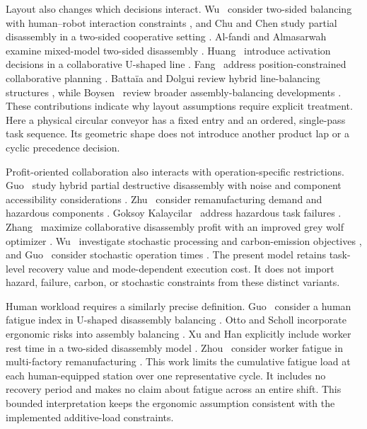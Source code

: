 Layout also changes which decisions interact. Wu \etal\ consider two-sided balancing with human--robot interaction constraints \cite{Wu2023}, and Chu and Chen study partial disassembly in a two-sided cooperative setting \cite{Chu2025}. Al-fandi and Almasarwah examine mixed-model two-sided disassembly \cite{Alfandi2025}. Huang \etal\ introduce activation decisions in a collaborative U-shaped line \cite{Huang2025}. Fang \etal\ address position-constrained collaborative planning \cite{Fang2024}. Batta\"ia and Dolgui review hybrid line-balancing structures \cite{Battaia2022}, while Boysen \etal\ review broader assembly-balancing developments \cite{Boysen2022}. These contributions indicate why layout assumptions require explicit treatment. Here a physical circular conveyor has a fixed entry and an ordered, single-pass task sequence. Its geometric shape does not introduce another product lap or a cyclic precedence decision.

Profit-oriented collaboration also interacts with operation-specific restrictions. Guo \etal\ study hybrid partial destructive disassembly with noise and component accessibility considerations \cite{Guo2024}. Zhu \etal\ consider remanufacturing demand and hazardous components \cite{Zhu2024}. Goksoy Kalaycilar \etal\ address hazardous task failures \cite{GoksoyKalaycilar2024}. Zhang \etal\ maximize collaborative disassembly profit with an improved grey wolf optimizer \cite{Zhang2025}. Wu \etal\ investigate stochastic processing and carbon-emission objectives \cite{Wu2024}, and Guo \etal\ consider stochastic operation times \cite{Guo2024a}. The present model retains task-level recovery value and mode-dependent execution cost. It does not import hazard, failure, carbon, or stochastic constraints from these distinct variants.

Human workload requires a similarly precise definition. Guo \etal\ consider a human fatigue index in U-shaped disassembly balancing \cite{Guo2023}. Otto and Scholl incorporate ergonomic risks into assembly balancing \cite{Otto2011}. Xu and Han explicitly include worker rest time in a two-sided disassembly model \cite{Xu2024}. Zhou \etal\ consider worker fatigue in multi-factory remanufacturing \cite{Zhou2025}. This work limits the cumulative fatigue load at each human-equipped station over one representative cycle. It includes no recovery period and makes no claim about fatigue across an entire shift. This bounded interpretation keeps the ergonomic assumption consistent with the implemented additive-load constraints.

